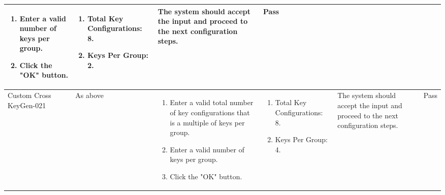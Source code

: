 \documentclass[]{final_report}
\theoremstyle{definition}
\begin{document}
\begin{longtable}{|p{1.5cm}|p{2.5cm}|p{3.5cm}|p{3cm}|p{3cm}|p{2cm}|}
\begin{enumerate}
    \item Enter a valid number of keys per group.
    \item Click the "OK" button.
  \end{enumerate} &  \begin{enumerate}
    \item Total Key Configurations: 8.
    \item Keys Per Group: 2.
   \end{enumerate}  & The system should accept the input and proceed to the next configuration steps. & Pass \\
  \hline
  Custom
  Cross
  KeyGen-021 & As above & 
  \begin{enumerate}
    \item Enter a valid total number of key configurations that is a multiple of keys per group.
    \item Enter a valid number of keys per group.
    \item Click the "OK" button.
  \end{enumerate} &  \begin{enumerate}
    \item Total Key Configurations: 8.
    \item Keys Per Group: 4.
   \end{enumerate}  & The system should accept the input and proceed to the next configuration steps. & Pass \\
  \hline
\end{longtable}
\end{document}
